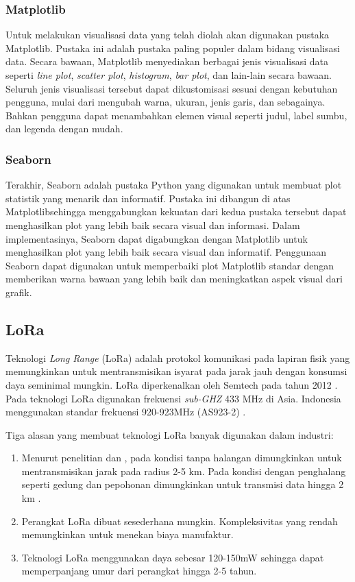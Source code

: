 \subsubsection{Matplotlib}
Untuk melakukan visualisasi data yang telah diolah akan digunakan pustaka Matplotlib. Pustaka ini adalah pustaka paling populer dalam bidang visualisasi data. Secara bawaan, Matplotlib menyediakan berbagai jenis visualisasi data seperti \textit{line plot}, \textit{scatter plot}, \textit{histogram}, \textit{bar plot}, dan lain-lain secara bawaan. Seluruh jenis visualisasi tersebut dapat dikustomisasi sesuai dengan kebutuhan pengguna, mulai dari mengubah warna, ukuran, jenis garis, dan sebagainya. Bahkan pengguna dapat menambahkan elemen visual seperti judul, label sumbu, dan legenda dengan mudah.

\subsubsection{Seaborn}
Terakhir, Seaborn adalah pustaka Python yang digunakan untuk membuat plot statistik yang menarik dan informatif. Pustaka ini dibangun di atas Matplotlibsehingga menggabungkan kekuatan dari kedua pustaka tersebut dapat menghasilkan plot yang lebih baik secara visual dan informasi. Dalam implementasinya, Seaborn dapat digabungkan dengan Matplotlib untuk menghasilkan plot yang lebih baik secara visual dan informatif. Penggunaan Seaborn dapat digunakan untuk memperbaiki plot Matplotlib standar dengan memberikan warna bawaan yang lebih baik dan meningkatkan aspek visual dari grafik.

\iffalse
\subsection{LoRa}
Teknologi \textit{Long Range} (LoRa) adalah protokol komunikasi pada lapiran fisik yang memungkinkan untuk mentransmisikan isyarat pada jarak jauh dengan konsumsi daya seminimal mungkin. LoRa diperkenalkan oleh Semtech pada tahun 2012 \cite{Oliveira2017}. Pada teknologi LoRa digunakan frekuensi \textit{sub-GHZ} 433 MHz di Asia. Indonesia menggunakan standar frekuensi 920-923MHz (AS923-2) \cite{LoRa2020}.

Tiga alasan yang membuat teknologi LoRa banyak digunakan dalam industri:

\begin{enumerate}
	\item Menurut penelitian \cite{Petajajarvi2016} dan \cite{Haxhibeqiri2017}, pada kondisi tanpa halangan dimungkinkan untuk mentransmisikan jarak pada radius 2-5 km. Pada kondisi dengan penghalang seperti gedung dan pepohonan dimungkinkan untuk transmisi data hingga 2 km \cite{Rida2019}.
	\item Perangkat LoRa dibuat sesederhana mungkin. Kompleksivitas yang rendah memungkinkan untuk menekan biaya manufaktur.
	\item Teknologi LoRa menggunakan daya sebesar 120-150mW sehingga dapat memperpanjang umur dari perangkat hingga 2-5 tahun.
\end{enumerate}

